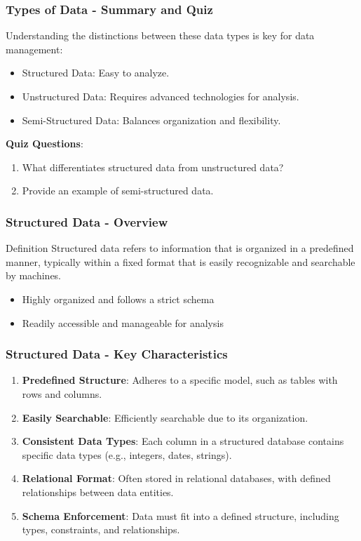 \documentclass{beamer}
\begin{document}
\begin{frame}[fragile]
    \frametitle{Types of Data - Summary and Quiz}
    Understanding the distinctions between these data types is key for data management:
    \begin{itemize}
        \item Structured Data: Easy to analyze.
        \item Unstructured Data: Requires advanced technologies for analysis.
        \item Semi-Structured Data: Balances organization and flexibility.
    \end{itemize}
    
    \vspace{0.5cm}
    
    \textbf{Quiz Questions}:
    \begin{enumerate}
        \item What differentiates structured data from unstructured data?
        \item Provide an example of semi-structured data.
    \end{enumerate}
\end{frame}

\begin{frame}[fragile]
    \frametitle{Structured Data - Overview}
    
    \begin{block}{Definition}
        Structured data refers to information that is organized in a predefined manner, typically within a fixed format that is easily recognizable and searchable by machines.
    \end{block}
    
    \begin{itemize}
        \item Highly organized and follows a strict schema
        \item Readily accessible and manageable for analysis
    \end{itemize}
\end{frame}

\begin{frame}[fragile]
    \frametitle{Structured Data - Key Characteristics}

    \begin{enumerate}
        \item \textbf{Predefined Structure}: Adheres to a specific model, such as tables with rows and columns.
        \item \textbf{Easily Searchable}: Efficiently searchable due to its organization.
        \item \textbf{Consistent Data Types}: Each column in a structured database contains specific data types (e.g., integers, dates, strings).
        \item \textbf{Relational Format}: Often stored in relational databases, with defined relationships between data entities.
        \item \textbf{Schema Enforcement}: Data must fit into a defined structure, including types, constraints, and relationships.
    \end{enumerate}
\end{frame}
\end{document}
